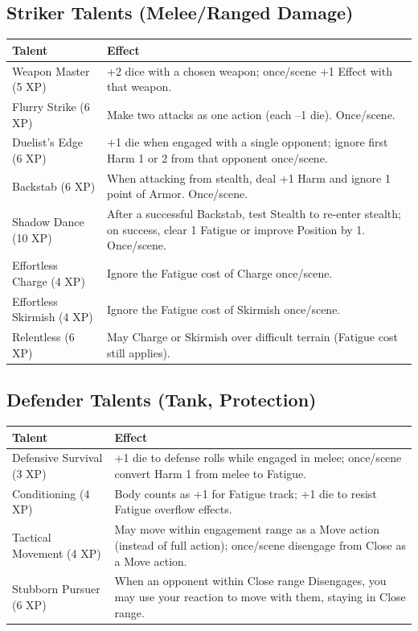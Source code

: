 \subsection{Striker Talents (Melee/Ranged Damage)}

\begin{tabular}{@{}lp{10cm}@{}}
\toprule
\textbf{Talent} & \textbf{Effect} \\
\midrule
Weapon Master (5 XP) & +2 dice with a chosen weapon; once/scene +1 Effect with that weapon. \\
Flurry Strike (6 XP) & Make two attacks as one action (each –1 die). Once/scene. \\
Duelist's Edge (6 XP) & +1 die when engaged with a single opponent; ignore first Harm 1 or 2 from that opponent once/scene. \\
Backstab (6 XP) & When attacking from stealth, deal +1 Harm and ignore 1 point of Armor. Once/scene. \\
Shadow Dance (10 XP) & After a successful Backstab, test Stealth to re-enter stealth; on success, clear 1 Fatigue or improve Position by 1. Once/scene. \\
Effortless Charge (4 XP) & Ignore the Fatigue cost of Charge once/scene. \\
Effortless Skirmish (4 XP) & Ignore the Fatigue cost of Skirmish once/scene. \\
Relentless (6 XP) & May Charge or Skirmish over difficult terrain (Fatigue cost still applies). \\
\bottomrule
\end{tabular}

\subsection{Defender Talents (Tank, Protection)}

\begin{tabular}{@{}lp{10cm}@{}}
\toprule
\textbf{Talent} & \textbf{Effect} \\
\midrule
Defensive Survival (3 XP) & +1 die to defense rolls while engaged in melee; once/scene convert Harm 1 from melee to Fatigue. \\
Conditioning (4 XP) & Body counts as +1 for Fatigue track; +1 die to resist Fatigue overflow effects. \\
Tactical Movement (4 XP) & May move within engagement range as a Move action (instead of full action); once/scene disengage from Close as a Move action. \\
Stubborn Pursuer (6 XP) & When an opponent within Close range Disengages, you may use your reaction to move with them, staying in Close range. \\
\bottomrule
\end{tabular}

